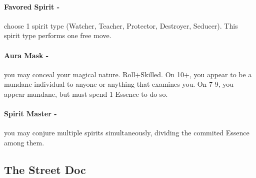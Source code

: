 \paragraph{Favored Spirit -} choose 1 spirit type (Watcher, Teacher, Protector, Destroyer, Seducer). This spirit type performs one free move.

\paragraph{Aura Mask -} you may conceal your magical nature. Roll+Skilled. On 10+, you appear to be a mundane individual to anyone or anything that examines you. On 7-9, you appear mundane, but must spend 1 Essence to do so.

\paragraph{Spirit Master -} you may conjure multiple spirits simultaneously, dividing the commited Essence among them.



\clearpage
\subsection{The Street Doc}

